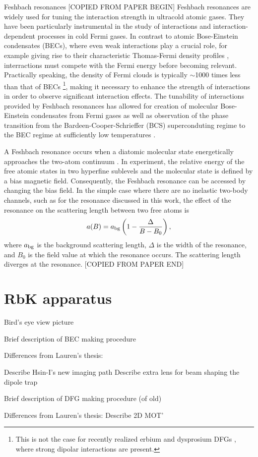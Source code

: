 Feshbach resonances 
[COPIED FROM PAPER BEGIN]
Feshbach resonances are widely used for tuning the interaction strength in ultracold atomic gases. They have been particularly instrumental in the study of interactions and interaction-dependent processes in cold Fermi gases. In contrast to atomic Bose-Einstein condensates (BECs), where even weak interactions play a crucial role, for example giving rise to their characteristic Thomas-Fermi density profiles \cite{KetterleBEC},  interractions must compete with the Fermi energy before becoming relevant. Practically speaking, the density of Fermi clouds is typically $\sim$1000 times less than that of BECs \footnote{This is not the case for recently realized erbium and dysprosium DFGs \cite{Aikawa14,Lu12}, where strong dipolar interactions are present.}, making it necessary to enhance the strength of interactions in order to observe significant interaction effects\cite{KetterleDFG}. The tunability of interactions provided by Feshbach resonances has allowed for creation of molecular Bose-Einstein condensates from Fermi gases \cite{Greiner03,Zwierlein03, Jochim03} as well as observation of the phase transition from the Bardeen-Cooper-Schrieffer (BCS) superconduting regime to the BEC regime at sufficiently low temperatures \cite{Bartenstein04, Bourdel04, Zwierlein04, Regal04}.
\par A Feshbach resonance occurs when a diatomic molecular state energetically approaches the two-atom continuum \cite{Chin10, Timmermans99}. In experiment, the relative energy of the free atomic states in two hyperfine sublevels and the molecular state is defined by a bias magnetic field. Consequently, the Feshbach resonance can be accessed by changing the bias field. In the simple case where there are no inelastic two-body channels, such as for the \K{} resonance discussed in this work, the effect of the resonance on the scattering length between two free atoms is \cite{Chin10}
\begin{equation}
a(B)=a_{\rm{bg}}\left(1-\frac{\Delta}{B-B_0}\right),
\label{feshbachEq}
\end{equation}
where $a_{\rm{bg}}$ is the background scattering length, $\Delta$ is the width of the resonance, and $B_0$ is the field value at which the resonance occurs. The scattering length diverges at the resonance.
[COPIED FROM PAPER END]

\section{RbK apparatus}

Bird's eye view picture

Brief description of BEC making procedure

Differences from Lauren's thesis:

    Describe Hsin-I's new imaging path
    Describe extra lens for beam shaping the dipole trap

Brief description of DFG making procedure (of old)

Differences from Lauren's thesis:
	    Describe 2D MOT'